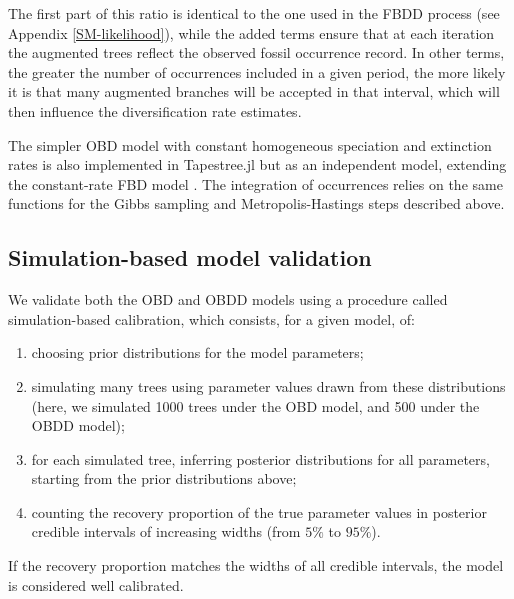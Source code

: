 \documentclass[oupdraft]{sysbio}
\begin{document}
The first part of this ratio is identical to the one used in the FBDD process (see Appendix \ref{SM-likelihood}), while the added terms ensure that at each iteration the augmented trees reflect the observed fossil occurrence record. In other terms, the greater the number of occurrences included in a given period, the more likely it is that many augmented branches will be accepted in that interval, which will then influence the diversification rate estimates.

The simpler OBD model with constant homogeneous speciation and extinction rates is also implemented in Tapestree.jl \citep{quintero_tapestreejl_2020} but as an independent model, extending the constant-rate FBD model \citep{quintero_rise_2025}. The integration of occurrences relies on the same functions for the Gibbs sampling and Metropolis-Hastings steps described above.

\subsection{Simulation-based model validation}

We validate both the OBD and OBDD models using a procedure called simulation-based calibration, which consists, for a given model, of:
\begin{enumerate}
    \item choosing prior distributions for the model parameters;
    \item simulating many trees using parameter values drawn from these distributions (here, we simulated 1000 trees under the OBD model, and 500 under the OBDD model);
    \item for each simulated tree, inferring posterior distributions for all parameters, starting from the prior distributions above;
    \item counting the recovery proportion of the true parameter values in posterior credible intervals of increasing widths (from $5\%$ to $95\%$).
\end{enumerate}
If the recovery proportion matches the widths of all credible intervals, the model is considered well calibrated.
\end{document}
